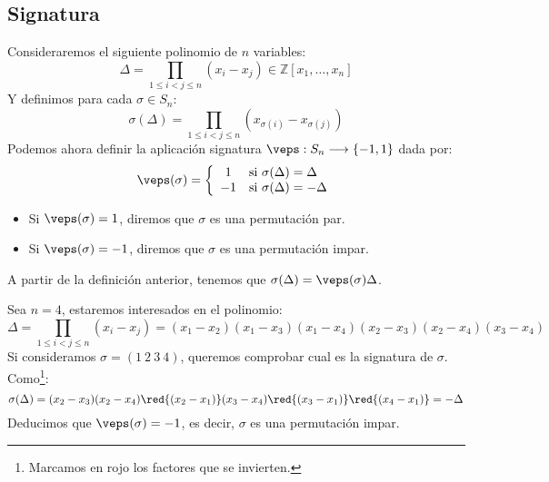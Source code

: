 \subsection{Signatura}
\begin{definicion}[Signatura]
    Consideraremos el siguiente polinomio de $n$ variables:
    \begin{equation*}
        \Delta = \prod_{1\leq i<j\leq n} (x_i-x_j) \in \mathbb{Z}[x_1,\ldots,x_n]
    \end{equation*}
    Y definimos para cada $\sigma\in S_n$:
    \begin{equation*}
        \sigma(\Delta) = \prod_{1\leq i<j\leq n}(x_{\sigma(i)}-x_{\sigma(j)})
    \end{equation*}
    Podemos ahora definir la aplicación signatura $\veps:S_n\longrightarrow \{-1,1\}$ dada por:
    \begin{equation*}
        \veps(\sigma) = \left\{\begin{array}{cl}
                1 & \text{si\ } \sigma(\Delta) = \Delta \\
                -1 & \text{si\ } \sigma(\Delta) = -\Delta 
        \end{array}\right.
    \end{equation*}
    \begin{itemize}
        \item Si $\veps(\sigma)=1$, diremos que $\sigma$ es una permutación par.
        \item Si $\veps(\sigma)=-1$, diremos que $\sigma$ es una permutación impar.
    \end{itemize}
\end{definicion}

\begin{observacion}
    A partir de la definición anterior, tenemos que $\sigma(\Delta)=\veps(\sigma)\Delta$.
\end{observacion}

\begin{ejemplo}
    Sea $n=4$, estaremos interesados en el polinomio:
    \begin{equation*}
        \Delta = \prod_{1\leq i<j\leq n} (x_i-x_j) = (x_1-x_2)(x_1-x_3)(x_1-x_4)(x_2-x_3)(x_2-x_4)(x_3-x_4)
    \end{equation*}
    Si consideramos $\sigma=(1\ 2\ 3\ 4)$, queremos comprobar cual es la signatura de $\sigma$. Como\footnote{Marcamos en rojo los factores que se invierten.}:
    \begin{equation*}
        \sigma(\Delta) = (x_2 - x_3)(x_2-x_4)\red{(x_2-x_1)}(x_3-x_4)\red{(x_3-x_1)}\red{(x_4-x_1)} = -\Delta
    \end{equation*}
    Deducimos que $\veps(\sigma)=-1$, es decir, $\sigma$ es una permutación impar.
\end{ejemplo}

